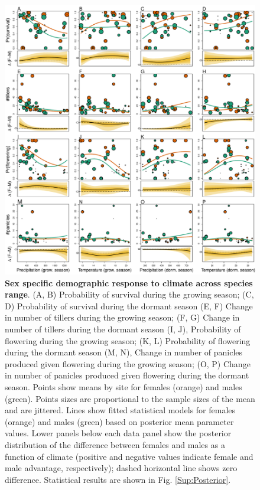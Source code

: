\documentclass[12pt]{article}
\begin{document}
\begin{figure}[H]
  \begin{center}
    \includegraphics[width=0.95\linewidth]{Figures/vital_rates.pdf}
  \caption{\textbf{Sex specific demographic response to climate across species range}.
  (A, B) Probability of survival during the growing season; (C, D) Probability of survival during the dormant season
  (E, F) Change in number of tillers during the growing season; (F, G) Change in number of tillers during the dormant season
  (I, J), Probability of flowering during the growing season; (K, L) Probability of flowering during the dormant season
  (M, N), Change in number of panicles produced given flowering during the growing season; (O, P) Change in number of panicles produced given flowering during the dormant season.
  Points show means by site for females (orange) and males (green). 
  Points sizes are proportional to the sample sizes of the mean and are jittered.
  Lines show fitted statistical models for females (orange) and males (green) based on posterior mean parameter values.
  Lower panels below each data panel show the posterior distribution of the difference between females and males as a function of climate (positive and negative values indicate female and male advantage, respectively); dashed horizontal line shows zero difference.
  Statistical results are shown in Fig. \ref{Sup:Posterior}.}
  \label{fig:vital_rates}
  \end{center}
\end{figure}
\end{document}
